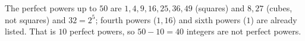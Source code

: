 The perfect powers up to $50$ are $1,4,9,16,25,36,49$ (squares) and $8,27$ (cubes, not squares) and $32=2^5$; fourth powers ($1,16$) and sixth powers ($1$) are already listed. That is $10$ perfect powers, so $50-10=\boxed{40}$ integers are not perfect powers.

